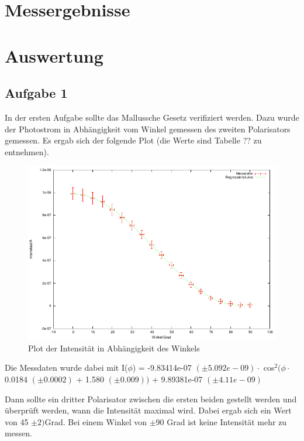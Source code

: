\documentclass[12pt]{scrartcl}
\begin{document}
\section{Messergebnisse}


\section{Auswertung}

\subsection{Aufgabe 1}
In der ersten Aufgabe sollte das Mallussche Gesetz verifiziert werden. Dazu wurde der Photostrom in Abhängigkeit vom Winkel gemessen des zweiten Polarisators gemessen. Es ergab sich der folgende Plot (die Werte sind Tabelle ?? zu entnehmen).

\begin{figure}[H]
\centering
    \includegraphics[scale = 1]{a_1.pdf}
  	\caption[Plot der Intensität in Abhängigkeit des Winkels]{Plot der Intensität in Abhängigkeit des Winkels}
  \label{fig:a_1}
\end{figure}

Die Messdaten wurde dabei mit I($\phi$) = -9.83414e-07 $(\pm 5.092e-09) \cdot$ cos$^2(\phi \cdot$ 0.0184 $(\pm 0.0002)$ + 1.580 $(\pm 0.009) )$ + 9.89381e-07 $(\pm 4.11e-09)$    

Dann sollte ein dritter Polarisator zwischen die ersten beiden gestellt werden und überprüft werden, wann die Intensität maximal wird. Dabei ergab sich ein Wert von 45 $\pm 2)$Grad. Bei einem Winkel von $\pm$90 Grad ist keine Intensität mehr zu messen.
\end{document}
